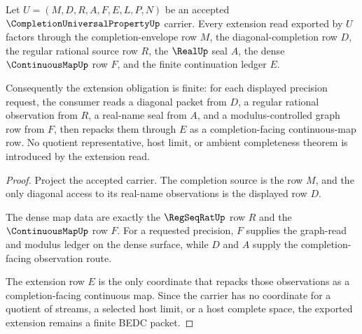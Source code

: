 \begin{theorem}
\label{thm:completion-universal-property-extension-obligations}
Let $U=(M,D,R,A,F,E,L,P,N)$ be an accepted $\CompletionUniversalPropertyUp$ carrier. Every extension read exported by $U$ factors through the completion-envelope row $M$, the diagonal-completion row $D$, the regular rational source row $R$, the $\RealUp$ seal $A$, the dense $\ContinuousMapUp$ row $F$, and the finite continuation ledger $E$.

Consequently the extension obligation is finite: for each displayed precision request, the consumer reads a diagonal packet from $D$, a regular rational observation from $R$, a real-name seal from $A$, and a modulus-controlled graph row from $F$, then repacks them through $E$ as a completion-facing continuous-map row. No quotient representative, host limit, or ambient completeness theorem is introduced by the extension read.
\end{theorem}
\begin{proof}
Project the accepted carrier. The completion source is the row $M$, and the only diagonal access to its real-name observations is the displayed row $D$.

The dense map data are exactly the $\RegSeqRatUp$ row $R$ and the $\ContinuousMapUp$ row $F$. For a requested precision, $F$ supplies the graph-read and modulus ledger on the dense surface, while $D$ and $A$ supply the completion-facing observation route.

The extension row $E$ is the only coordinate that repacks those observations as a completion-facing continuous map. Since the carrier has no coordinate for a quotient of streams, a selected host limit, or a host complete space, the exported extension remains a finite BEDC packet.
\end{proof}


